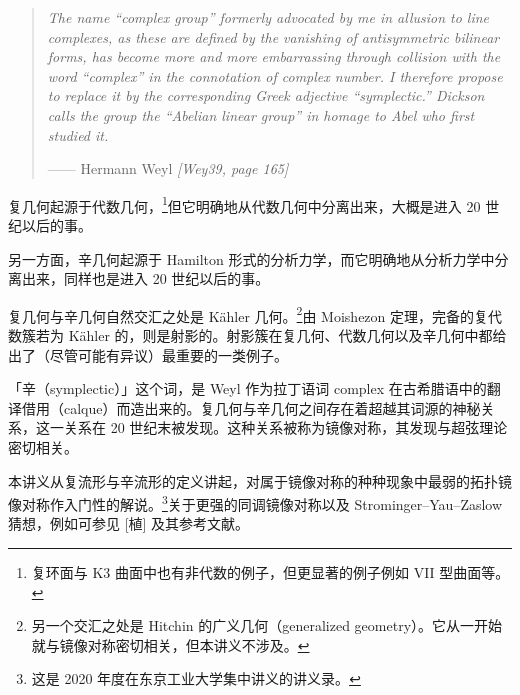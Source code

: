 
\vspace{1em}
\begin{quote}
\itshape
The name ``complex group'' formerly advocated by me in allusion to line complexes, as these are
defined by the vanishing of antisymmetric bilinear forms, has become more and more embarrassing
through collision with the word ``complex'' in the connotation of complex number. I therefore
propose to replace it by the corresponding Greek adjective ``symplectic.'' Dickson calls the group
the ``Abelian linear group'' in homage to Abel who first studied it.

\upshape
\raggedleft —— Hermann Weyl \textit{[Wey39, page 165]}
\par
\end{quote}

\vspace{0.5em}

\vspace{1em}

复几何起源于代数几何，\footnote{复环面与 K3 曲面中也有非代数的例子，但更显著的例子例如 VII 型曲面等。}但它明确地从代数几何中分离出来，大概是进入 20 世纪以后的事。

另一方面，辛几何起源于 Hamilton 形式的分析力学，而它明确地从分析力学中分离出来，同样也是进入 20 世纪以后的事。

复几何与辛几何自然交汇之处是 Kähler 几何。\footnote{另一个交汇之处是 Hitchin 的广义几何（generalized geometry）。它从一开始就与镜像对称密切相关，但本讲义不涉及。}由 Moishezon 定理，完备的复代数簇若为 Kähler 的，则是射影的。射影簇在复几何、代数几何以及辛几何中都给出了（尽管可能有异议）最重要的一类例子。

「辛（symplectic）」这个词，是 Weyl 作为拉丁语词 complex 在古希腊语中的翻译借用（calque）而造出来的。复几何与辛几何之间存在着超越其词源的神秘关系，这一关系在 20 世纪末被发现。这种关系被称为镜像对称，其发现与超弦理论密切相关。

本讲义从复流形与辛流形的定义讲起，对属于镜像对称的种种现象中最弱的拓扑镜像对称作入门性的解说。\footnote{这是 2020 年度在东京工业大学集中讲义的讲义录。}关于更强的同调镜像对称以及 Strominger–Yau–Zaslow 猜想，例如可参见 [植] 及其参考文献。

